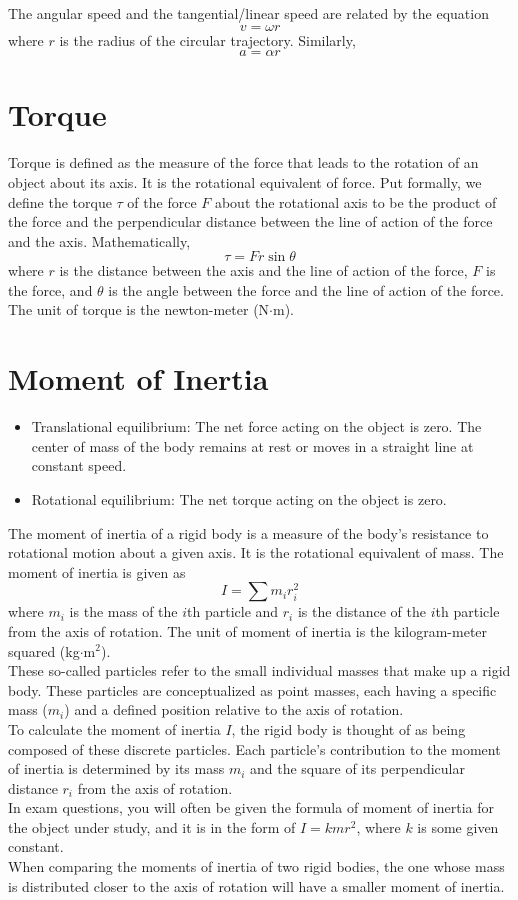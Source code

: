 \documentclass[a4paper,12pt]{article}
\let\oldsection\section
\renewcommand\section{\clearpage\oldsection}
\newcommand{\lb}{\\[8pt]}
\begin{document}
The angular speed and the tangential/linear speed are related by the equation $$v = \omega r$$where $r$ is the radius of the circular trajectory. Similarly, $$a = \alpha r$$

\section{Torque}

Torque is defined as the measure of the force that leads to the rotation of an object about its axis. It is the rotational equivalent of force. Put formally, we define the torque $\tau$ of the force $F$ about the rotational axis to be the product of the force and the perpendicular distance between the line of action of
the force and the axis. Mathematically, $$\tau = Fr\sin\theta$$where $r$ is the distance between the axis and the line of action of the force, $F$ is the force, and $\theta$ is the angle between the force and the line of action of the force. The unit of torque is the newton-meter (N$\cdot$m).

\section{Moment of Inertia}

\begin{itemize}
  \item Translational equilibrium: The net force acting on the object is zero. The center of mass of the body remains at rest or moves in a straight line at constant speed.
  \item Rotational equilibrium: The net torque acting on the object is zero.
\end{itemize}

The moment of inertia of a rigid body is a measure of the body's resistance to rotational motion about a given axis. It is the rotational equivalent of mass. The moment of inertia is given as $$I = \sum m_ir_i^2$$where $m_i$ is the mass of the $i$th particle and $r_i$ is the distance of the $i$th particle from the axis of rotation. The unit of moment of inertia is the kilogram-meter squared (kg$\cdot$m$^2$).\lb
These so-called particles refer to the small individual masses that make up a rigid body. These particles are conceptualized as point masses, each having a specific mass ($m_i$) and a defined position relative to the axis of rotation.\lb
To calculate the moment of inertia $I$, the rigid body is thought of as being composed of these discrete particles. Each particle's contribution to the moment of inertia is determined by its mass $m_i$ and the square of its perpendicular distance $r_i$ from the axis of rotation.\lb
In exam questions, you will often be given the formula of moment of inertia for the object under study, and it is in the form of $I = kmr^2$, where $k$ is some given constant.\lb
When comparing the moments of inertia of two rigid bodies, the one whose mass is distributed closer to the axis of rotation will have a smaller moment of inertia.
\end{document}
